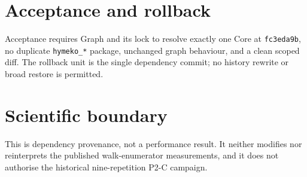 \documentclass[11pt]{article}
\begin{document}
\section{Acceptance and rollback}
Acceptance requires Graph and its lock to resolve exactly one Core at
\texttt{fc3eda9b}, no duplicate \texttt{hymeko\_*} package, unchanged graph
behaviour, and a clean scoped diff.  The rollback unit is the single dependency
commit; no history rewrite or broad restore is permitted.

\section{Scientific boundary}
This is dependency provenance, not a performance result.  It neither modifies
nor reinterprets the published walk-enumerator measurements, and it does not
authorise the historical nine-repetition P2-C campaign.
\end{document}
